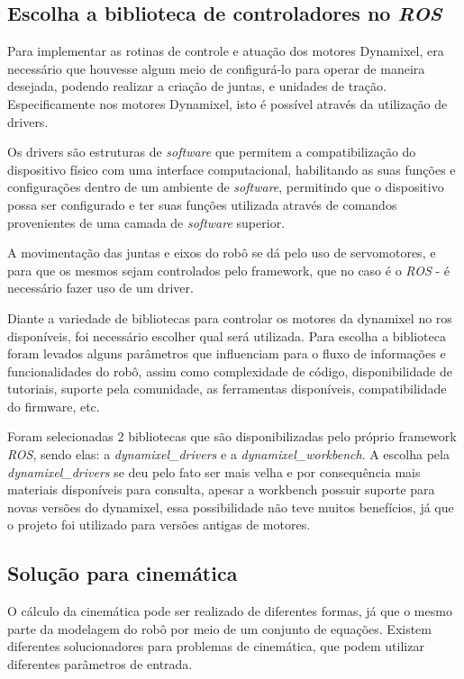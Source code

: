 \subsection{Escolha a biblioteca de controladores no \textit{ROS}}\label{sec:contr_ros}
Para implementar as rotinas de controle e atuação dos motores Dynamixel, era necessário que houvesse algum meio de configurá-lo para operar de maneira desejada, podendo realizar a criação de juntas, e unidades de tração. Especificamente nos motores Dynamixel, isto é possível através da utilização de drivers.

Os drivers são estruturas de \textit{software} que permitem a compatibilização do dispositivo físico com uma interface computacional, habilitando as suas funções e configurações dentro de um ambiente de \textit{software}, permitindo que o dispositivo possa ser configurado e ter suas funções utilizada através de comandos provenientes de uma camada de \textit{software} superior.

A movimentação das juntas e eixos do robô se dá pelo uso de servomotores, e para que os mesmos sejam controlados pelo framework, que no caso é o \textit{ROS} - é necessário fazer uso de um driver.

Diante a variedade de bibliotecas para controlar os motores da dynamixel no ros disponíveis, foi necessário escolher qual será utilizada. Para escolha a biblioteca foram levados alguns parâmetros que influenciam para o fluxo de informações e funcionalidades do robô, assim como complexidade de código, disponibilidade de tutoriais, suporte pela comunidade, as ferramentas disponíveis, compatibilidade do firmware, etc.

Foram selecionadas 2 bibliotecas que são disponibilizadas pelo próprio framework \textit{ROS}, sendo elas: a  \textit{dynamixel\_drivers} e a \textit{dynamixel\_workbench}. A escolha pela \textit{dynamixel\_drivers} se deu pelo fato ser mais velha e por consequência mais materiais disponíveis para consulta, apesar a workbench possuir suporte para novas versões do dynamixel, essa possibilidade não teve muitos benefícios, já que o projeto foi utilizado para versões antigas de motores. 

\subsection{Solução para cinemática}\label{sec:sol_cine}
O cálculo da cinemática pode ser realizado de diferentes formas, já que o mesmo parte da modelagem do robô por meio de um conjunto de equações. Existem diferentes solucionadores para problemas de cinemática, que podem utilizar diferentes parâmetros de entrada.

